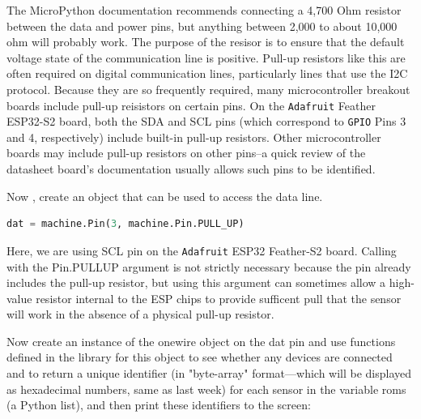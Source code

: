 The MicroPython documentation recommends connecting a 4,700 Ohm resistor between the data and power pins, but anything between 2,000 to about 10,000 ohm will probably work. 
The purpose of the resisor is to ensure that the default voltage state of the communication line is positive.  
Pull-up resistors like this are often required on digital communication lines, particularly lines that use the I2C protocol.  
Because they are so frequently required, many microcontroller breakout boards include pull-up reisistors on certain pins.  
On the \texttt{Adafruit} Feather ESP32-S2 board, both the SDA and SCL pins (which correspond to \texttt{GPIO} Pins 3 and 4, respectively) include built-in pull-up resistors. 
Other microcontroller boards may include pull-up resistors on other pins--a quick review of the datasheet board's documentation usually allows such pins to be identified.  
 
Now , create an object that can be used to access the data line.

\begin{lstlisting}[language=Python]
dat = machine.Pin(3, machine.Pin.PULL_UP)
\end{lstlisting}

Here, we are using SCL pin on the \texttt{Adafruit} ESP32 Feather-S2 board. 
Calling with the Pin.PULL\textunderscore UP argument is not strictly necessary because the pin already includes the pull-up resistor, but using this argument can sometimes allow a high-value resistor internal to the ESP chips to provide sufficent pull that the sensor will work in the absence of a physical pull-up resistor.

Now create an instance of the onewire object on the dat pin and use functions defined in the library for this object to see whether any devices are connected and to return a unique identifier (in "byte-array" format—which will be displayed as hexadecimal numbers, same as last week) for each sensor in the variable roms (a Python list), and then print these identifiers to the screen:  

